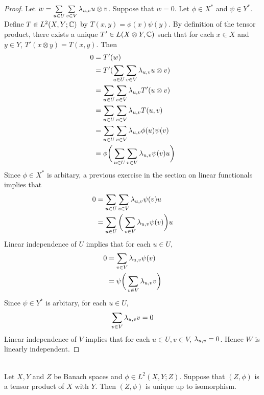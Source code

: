 \documentclass{book}
\begin{document}
	\begin{proof}
	Let $w = \sum\limits_{u \in U} \sum\limits_{v \in V}\lambda_{u,v} u \otimes v$. Suppose that $w = 0$. Let $\phi \in X^*$ and $\psi \in Y^*$. Define $T \in L^2(X, Y; \mathbb{C})$ by $T(x,y) = \phi(x)\psi(y)$. By definition of the tensor product, there exists a unique $T' \in L(X \otimes Y, \mathbb{C})$ such that for each $x \in X$ and $y \in Y$, $T'(x \otimes y) = T(x,y)$. Then 
	\begin{align*}
	0 
	&= T'(w) \\
	&= T'(\sum\limits_{u \in U} \sum\limits_{v \in V}\lambda_{u,v} u \otimes v) \\
	&= \sum\limits_{u \in U} \sum\limits_{v \in V}\lambda_{u,v} T'(u \otimes v) \\
	&= \sum\limits_{u \in U} \sum\limits_{v \in V}\lambda_{u,v} T(u, v) \\
	&= \sum\limits_{u \in U} \sum\limits_{v \in V}\lambda_{u,v} \phi(u)\psi(v) \\
	&= \phi\bigg( \sum\limits_{u \in U} \sum\limits_{v \in V}\lambda_{u,v}  \psi(v) u \bigg)
	\end{align*}
	Since $\phi \in X^*$ is arbitary, a previous exercise in the section on linear functionals implies that 
	\begin{align*}
	0 
	&= \sum\limits_{u \in U} \sum\limits_{v \in V}\lambda_{u,v}  \psi(v) u \\
	&= \sum\limits_{u \in U} \bigg (\sum\limits_{v \in V}\lambda_{u,v}  \psi(v)  \bigg) u
	\end{align*}
	Linear independence of $U$ implies that for each $u \in U$, 
	\begin{align*}
	0 
	&= \sum\limits_{v \in V}\lambda_{u,v}  \psi(v) \\
	&= \psi \bigg( \sum\limits_{v \in V}\lambda_{u,v}  v \bigg )
	\end{align*}
	Since $\psi \in Y^*$ is arbitary, for each $u \in U$, $$\sum\limits_{v \in V}\lambda_{u,v}  v = 0$$
	Linear independence of $V$ implies that for each $u \in U, v \in V$, $\lambda_{u,v} = 0$. Hence $W$ is linearly independent. 
	\end{proof}
	
	\begin{ex} \\
	Let $X, Y$ and $Z$ be Banach spaces and $\phi \in L^2(X,Y ; Z)$. Suppose that $(Z, \phi)$ is a tensor product of $X$ with $Y$. Then $(Z, \phi)$ is unique up to isomorphism. 
	\end{ex}
	
\end{document}
